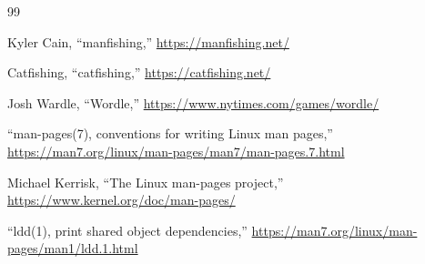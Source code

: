 \documentclass{article}
\begin{document}
\begin{thebibliography}{99}

Kyler Cain, ``manfishing,''
\url{https://manfishing.net/}

Catfishing, ``catfishing,''
\url{https://catfishing.net/}

Josh Wardle, ``Wordle,''
\url{https://www.nytimes.com/games/wordle/}

``man-pages(7), conventions for writing Linux man pages,''
\url{https://man7.org/linux/man-pages/man7/man-pages.7.html}

Michael Kerrisk, ``The Linux man-pages project,''
\url{https://www.kernel.org/doc/man-pages/}

``ldd(1), print shared object dependencies,''
\url{https://man7.org/linux/man-pages/man1/ldd.1.html}

\end{thebibliography}
\end{document}
